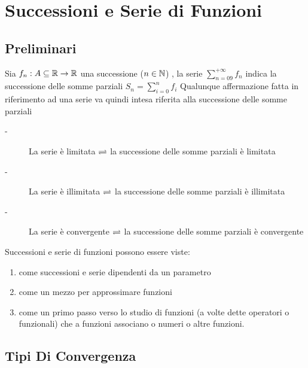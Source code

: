 \chapter{Successioni e Serie di Funzioni}
\section{Preliminari}
Sia $f_n:A\subseteq \mathbb{R}\to \mathbb{R}$ una successione ($n\in\mathbb{N}$) , la serie $\sum\limits_{n=09}^{+\infty}f_n$ indica la successione delle somme parziali $S_n = \sum\limits_{i=0}^nf_i$
\observation
Qualunque affermazione fatta in riferimento ad una serie va quindi intesa riferita alla successione delle somme parziali
\begin{description}
	\item[-] La serie è limitata $\rightleftharpoons$ la successione delle somme parziali è limitata
	\item[-] La serie è illimitata $\rightleftharpoons$ la successione delle somme parziali è illimitata
	\item[-] La serie è convergente $\rightleftharpoons$ la successione delle somme parziali è convergente
\end{description}
\observation
Successioni e serie di funzioni possono essere viste:
\begin{enumerate}
	\item come successioni e serie dipendenti da un parametro
	\item come un mezzo per approssimare funzioni
	\item come un primo passo verso lo studio di funzioni (a volte dette operatori o funzionali) che a funzioni associano o numeri o altre funzioni.
\end{enumerate}
\newpage
\section{Tipi Di Convergenza}
